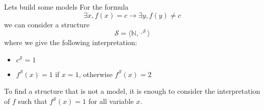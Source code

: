 \documentclass[aspectratio=169]{beamer}
\begin{document}
\begin{slide}{Lets build some models}
For the formula $$\exists x, f(x) = c \to \exists y, f(y) \not= c$$ we can consider a structure $$\mathcal{S} = \langle \mathbb{N},\cdot^\mathcal{S} \rangle$$
where we give the following interpretation:
\begin{itemize}
  \item $c^\mathcal{S} = 1$
  \item $f^\mathcal{S}(x) = 1$ if $x = 1$, otherwise $f^\mathcal{S}(x) = 2$
\end{itemize} 

To find a structure that is not a model, it is enough to consider the interpretation of $f$ such that $f^\mathcal{S}(x) = 1$ for all variable $x$.
\end{slide}






%
%  
%
%  
%
%  
%
%  
%
%  
%
%  
%
%  
%
%  
%
%  
%
%  
%
%  
%
%  
%
%  
%
%  
%
%  
%
%  
%
%  
%
%  
%
%  
%
%  
\end{document}
